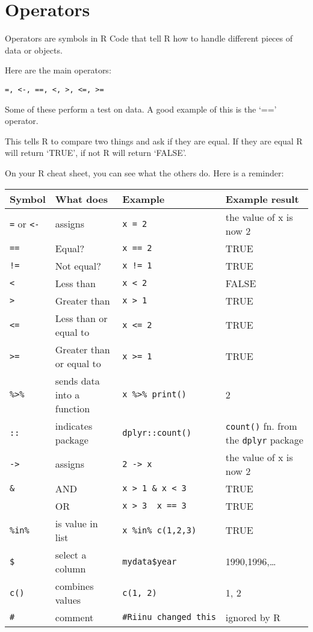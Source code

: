\documentclass[]{book}
\theoremstyle{definition}
\theoremstyle{definition}
\theoremstyle{definition}
\theoremstyle{remark}
\begin{document}
\section{Operators}\label{operators}

Operators are symbols in R Code that tell R how to handle different
pieces of data or objects.

Here are the main operators:

\texttt{=,\ \textless{}-,\ ==,\ \textless{},\ \textgreater{},\ \textless{}=,\ \textgreater{}=}

Some of these perform a test on data. A good example of this is the `=='
operator.

This tells R to compare two things and ask if they are equal. If they
are equal R will return `TRUE', if not R will return `FALSE'.

On your R cheat sheet, you can see what the others do. Here is a
reminder:

\begin{longtable}[]{@{}llll@{}}
\toprule
Symbol & What does & Example & Example result\tabularnewline
\midrule
\endhead
\texttt{=} or \texttt{\textless{}-} & assigns & \texttt{x\ =\ 2} & the
value of x is now 2\tabularnewline
\texttt{==} & Equal? & \texttt{x\ ==\ 2} & TRUE\tabularnewline
\texttt{!=} & Not equal? & \texttt{x\ !=\ 1} & TRUE\tabularnewline
\texttt{\textless{}} & Less than & \texttt{x\ \textless{}\ 2} &
FALSE\tabularnewline
\texttt{\textgreater{}} & Greater than & \texttt{x\ \textgreater{}\ 1} &
TRUE\tabularnewline
\texttt{\textless{}=} & Less than or equal to &
\texttt{x\ \textless{}=\ 2} & TRUE\tabularnewline
\texttt{\textgreater{}=} & Greater than or equal to &
\texttt{x\ \textgreater{}=\ 1} & TRUE\tabularnewline
\texttt{\%\textgreater{}\%} & sends data into a function &
\texttt{x\ \%\textgreater{}\%\ print()} & 2\tabularnewline
\texttt{::} & indicates package & \texttt{dplyr::count()} &
\texttt{count()} fn. from the \texttt{dplyr} package\tabularnewline
\texttt{-\textgreater{}} & assigns & \texttt{2\ -\textgreater{}\ x} &
the value of x is now 2\tabularnewline
\texttt{\&} & AND & \texttt{x\ \textgreater{}\ 1\ \&\ x\ \textless{}\ 3}
& TRUE\tabularnewline
\texttt{\textbar{}} & OR &
\texttt{x\ \textgreater{}\ 3\ \textbar{}\ x\ ==\ 3} &
TRUE\tabularnewline
\texttt{\%in\%} & is value in list & \texttt{x\ \%in\%\ c(1,2,3)} &
TRUE\tabularnewline
\texttt{\$} & select a column & \texttt{mydata\$year} &
1990,1996,\ldots{}\tabularnewline
\texttt{c()} & combines values & \texttt{c(1,\ 2)} & 1, 2\tabularnewline
\texttt{\#} & comment & \texttt{\#Riinu\ changed\ this} & ignored by
R\tabularnewline
\bottomrule
\end{longtable}
\end{document}
